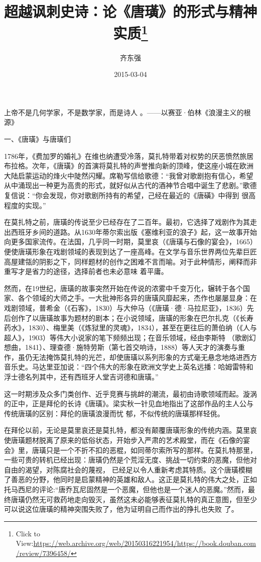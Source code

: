 \documentclass{article}
\title{超越讽刺史诗：论《唐璜》的形式与精神实质\footnote{Click to View:\url{https://web.archive.org/web/20150316221954/https://book.douban.com/review/7396458/}}}
\author{齐东强}
\date{2015-03-04}
\begin{document}

\maketitle


\Large

﻿上帝不是几何学家，不是数学家，而是诗人
。——以赛亚·伯林《浪漫主义的根源》 


一、《唐璜》与唐璜们 

1786年，《费加罗的婚礼》在维也纳遭受冷落，莫扎特带着对权势的厌恶愤然旅居布拉格。次年，《唐璜》的首演将莫扎特的声誉推向新的顶峰，使这座小城在欧洲大陆启蒙运动的烽火中陡然闪耀。席勒写信给歌德：“我曾对歌剧抱有信心，希望从中涌现出一种更为高贵的形式，就好似从古代的酒神节合唱中诞生了悲剧。”歌德复信说：“你会发现，你对歌剧所持有的希望，己经在最近的《唐磺》中得到
很高程度的实现。” 

\newpage

在莫扎特之前，唐璜的传说至少已经存在了二百年。最初，它选择了戏剧作为其走出西班牙乡间的道路。从1630年蒂尔索出版《塞维利亚的浪子》起，这一故事开始向更多国家流传。在法国，几乎同一时期，莫里哀（《唐璜与石像的宴会》，1665）便使唐璜形象在戏剧领域的表现到达了一座高峰。在文学与音乐世界两位先辈巨匠高屋建瓴的阴影之下，同样题材的创作之困难不言而喻。对于此种情形，阐释而非重写才是省力的途径，选择前者也未必意味
着平庸。 

然而，在19世纪，唐璜的故事突然开始在传说的浓雾中千变万化，辗转于各个国家、各个领域的大师之手。一大批神形各异的唐璜风靡起来，杰作也屡屡显身：在戏剧领域，普希金（《石客》，1830）与大仲马（《唐璜·德·马拉尼亚》，1836）先后创作了以唐璜故事为题材的剧本；在小说领域，唐璜的形象在巴尔扎克（《长寿药水》，1830）、梅里美（《炼狱里的灵魂》，1834），甚至在更往后的萧伯纳（《人与超人》，1903）等伟大小说家的笔下频频出现；在音乐领域，经由李斯特
\newpage
（歌剧幻想曲，1841）、理查德·施特劳斯（第七首交响诗，1888）等人天才的演奏与重作，虽仍无法掩饰莫扎特的光芒，却使唐璜以系列形象的方式毫无悬念地烙进西方音乐史。马达里亚加说：“四个伟大的形象在欧洲文学史上英名远播：哈姆雷特和浮士德名列其中，还有西班牙人堂吉诃德和唐璜。”
 

这一时期涉及众多门类创作、近乎竞赛与挑衅的潮流，最初由诗歌领域而起。漩涡的正中，正是拜伦的长诗《唐璜》。梁实秋一针见血地指出了这部作品的主人公与传统唐璜的区别：拜伦的唐璜浪漫而忧
郁，不似传统的唐璜那样轻佻。 

在拜伦以前，无论是莫里哀还是莫扎特，都没有颠覆唐璜形象的传统内涵。莫里哀使唐璜题材脱离了原来的低俗状态，开始步入严肃的艺术殿堂，而在《石像的宴会》里，唐璜只是一个不折不扣的恶棍，如同蒂尔索所写的那样。在莫扎特那里，一些可贵的转机已经出现：唐璜仍然是个荒淫无度、挑战一切约束的恶魔，但他对自由的渴望，对陈腐社会的蔑视，
\newpage
已经足以令人重新考虑其特质。这个唐璜模糊了善恶的分野，他同时是启蒙精神的英雄和敌人。这正是莫扎特的伟大之处，正如托马西尼的评论:“唐乔瓦尼固然是一个恶魔，但他也是一个迷人的恶魔。”然而，最终唐璜仍然无可救药地走向毁灭，虽然这未必能够表征莫扎特的真正意图，但至少可以说这位唐璜的精神突围失败了，他为证明自己而作出的挣扎也失败
了。 
\end{document}
